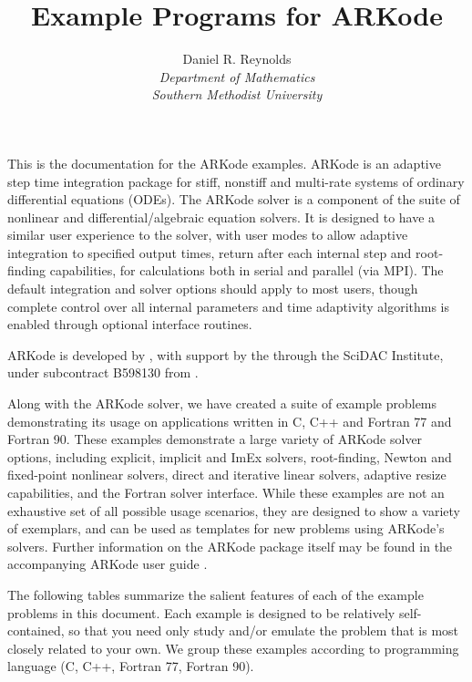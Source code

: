 \documentclass[letterpaper,10pt,english]{sphinxmanual}
\title{Example Programs for ARKode}
\author{Daniel R. Reynolds\\
  {\em Department of Mathematics}\\
  {\em Southern Methodist University}
}
\date{
  \today
  \vfill
  {\centerline{\texttt{[image: doc\_logo\_blue.pdf]}}}
  \vfill
}
\begin{document}
\maketitle
\sphinxtableofcontents
{}\label{\detokenize{index::doc}}


This is the documentation for the ARKode examples.  ARKode is an
adaptive step time integration package for stiff, nonstiff and
multi-rate systems of ordinary differential equations (ODEs).
The ARKode solver is a component of the  suite of
nonlinear and differential/algebraic equation solvers. It is designed
to have a similar user experience to the 
solver, with user modes to allow adaptive integration to specified
output times, return after each internal step and root-finding
capabilities, for calculations both in serial and parallel (via
MPI). The default integration and solver options should apply to most
users, though complete control over all internal parameters and time
adaptivity algorithms is enabled through optional interface routines.

ARKode is developed by , with support by the  through the  SciDAC Institute, under subcontract
B598130 from .

Along with the ARKode solver, we have created a suite of example
problems demonstrating its usage on applications written in C, C++ and
Fortran 77 and Fortran 90.  These examples demonstrate a large variety
of ARKode solver options, including explicit, implicit and ImEx
solvers, root-finding, Newton and fixed-point nonlinear solvers,
direct and iterative linear solvers, adaptive resize capabilities, and
the Fortran solver interface.  While these examples are not an
exhaustive set of all possible usage scenarios, they are designed to
show a variety of exemplars, and can be used as templates for new
problems using ARKode’s solvers.  Further information on the ARKode
package itself may be found in the accompanying ARKode user guide
\label{\detokenize{index:id1}}{\hyperref[\detokenize{References:r2018}]{\sphinxcrossref{{[}R2018{]}}}}.

The following tables summarize the salient features of each of the
example problems in this document.  Each example is designed to be
relatively self-contained, so that you need only study and/or emulate
the problem that is most closely related to your own.  We group these
examples according to programming language (C, C++, Fortran 77,
Fortran 90).
\end{document}
